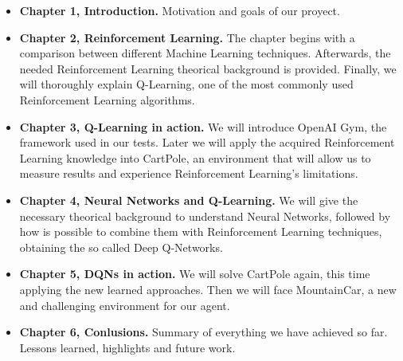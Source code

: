 \begin{itemize}
    \item \textbf{Chapter 1, Introduction.} Motivation and goals of our proyect.
    \item \textbf{Chapter 2, Reinforcement Learning.} The chapter begins with a comparison between different Machine Learning techniques. Afterwards, the needed Reinforcement Learning theorical background is provided. Finally, we will thoroughly explain Q-Learning, one of the most commonly used Reinforcement Learning algorithms.
    \item \textbf{Chapter 3, Q-Learning in action.} We will introduce OpenAI Gym, the framework used in our tests. Later we will apply the acquired Reinforcement Learning knowledge into CartPole, an environment that will allow us to measure results and experience Reinforcement Learning's limitations.
    \item \textbf{Chapter 4, Neural Networks and Q-Learning.} We will give the necessary theorical background to understand Neural Networks, followed by how is possible to combine them with Reinforcement Learning techniques, obtaining the so called Deep Q-Networks.
    \item \textbf{Chapter 5, DQNs in action.} We will solve CartPole again, this time applying the new learned approaches. Then we will face MountainCar, a new and challenging environment for our agent.
    \item \textbf{Chapter 6, Conlusions.} Summary of everything we have achieved so far. Lessons learned, highlights and future work.    
\end{itemize}
